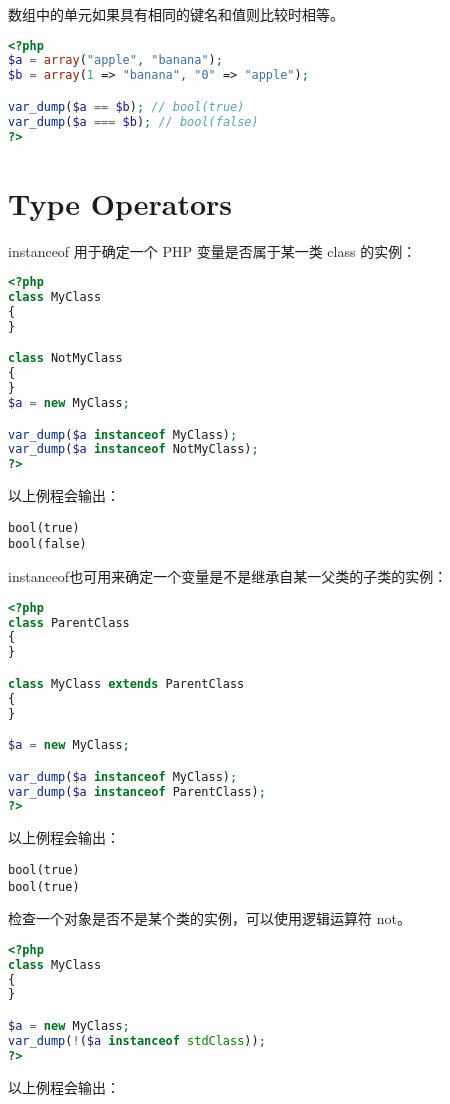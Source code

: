 数组中的单元如果具有相同的键名和值则比较时相等。

\begin{lstlisting}[language=PHP]
<?php
$a = array("apple", "banana");
$b = array(1 => "banana", "0" => "apple");

var_dump($a == $b); // bool(true)
var_dump($a === $b); // bool(false)
?>
\end{lstlisting}


\section{Type Operators}


instanceof 用于确定一个 PHP 变量是否属于某一类 class 的实例：

\begin{lstlisting}[language=PHP]
<?php
class MyClass
{
}

class NotMyClass
{
}
$a = new MyClass;

var_dump($a instanceof MyClass);
var_dump($a instanceof NotMyClass);
?>
\end{lstlisting}


以上例程会输出：

\begin{verbatim}
bool(true)
bool(false)
\end{verbatim}

instanceof也可用来确定一个变量是不是继承自某一父类的子类的实例：

\begin{lstlisting}[language=PHP]
<?php
class ParentClass
{
}

class MyClass extends ParentClass
{
}

$a = new MyClass;

var_dump($a instanceof MyClass);
var_dump($a instanceof ParentClass);
?>
\end{lstlisting}

以上例程会输出：

\begin{verbatim}
bool(true)
bool(true)
\end{verbatim}

检查一个对象是否不是某个类的实例，可以使用逻辑运算符 not。


\begin{lstlisting}[language=PHP]
<?php
class MyClass
{
}

$a = new MyClass;
var_dump(!($a instanceof stdClass));
?>
\end{lstlisting}

以上例程会输出：

